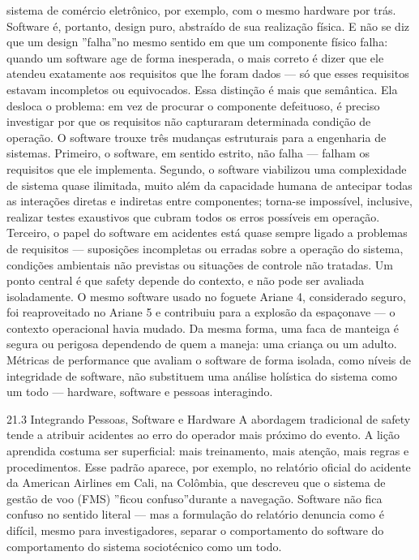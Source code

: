 sistema de comércio eletrônico, por exemplo, com o mesmo hardware por trás. Software é, portanto, design puro, abstraído de sua realização física. E não se diz que um design ”falha”no mesmo sentido em que um componente físico falha: quando um software age de forma inesperada, o mais correto é dizer que ele atendeu exatamente aos requisitos que lhe foram dados — só que esses requisitos estavam incompletos ou equivocados. Essa distinção é mais que semântica. Ela desloca o problema: em vez de procurar o componente defeituoso, é preciso investigar por que os requisitos não capturaram determinada condição de operação. O software trouxe três mudanças estruturais para a engenharia de sistemas. Primeiro, o software, em sentido estrito, não falha — falham os requisitos que ele implementa. Segundo, o software viabilizou uma complexidade de sistema quase ilimitada, muito além da capacidade humana de antecipar todas as interações diretas e indiretas entre componentes; torna-se impossível, inclusive, realizar testes exaustivos que cubram todos os erros possíveis em operação. Terceiro, o papel do software em acidentes está quase sempre ligado a problemas de requisitos — suposições incompletas ou erradas sobre a operação do sistema, condições ambientais não previstas ou situações de controle não tratadas. Um ponto central é que safety depende do contexto, e não pode ser avaliada isoladamente. O mesmo software usado no foguete Ariane 4, considerado seguro, foi reaproveitado no Ariane 5 e contribuiu para a explosão da espaçonave — o contexto operacional havia mudado. Da mesma forma, uma faca de manteiga é segura ou perigosa dependendo de quem a maneja: uma criança ou um adulto. Métricas de performance que avaliam o software de forma isolada, como níveis de integridade de software, não substituem uma análise holística do sistema como um todo — hardware, software e pessoas interagindo.

21.3 Integrando Pessoas, Software e Hardware A abordagem tradicional de safety tende a atribuir acidentes ao erro do operador mais próximo do evento. A lição aprendida costuma ser superficial: mais treinamento, mais atenção, mais regras e procedimentos. Esse padrão aparece, por exemplo, no relatório oficial do acidente da American Airlines em Cali, na Colômbia, que descreveu que o sistema de gestão de voo (FMS) ”ficou confuso”durante a navegação. Software não fica confuso no sentido literal — mas a formulação do relatório denuncia como é difícil, mesmo para investigadores, separar o comportamento do software do comportamento do sistema sociotécnico como um todo.

